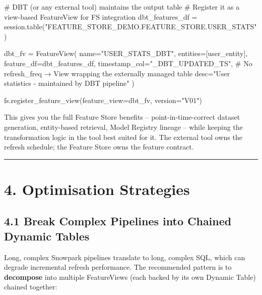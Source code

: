 \documentclass[
  letterpaper,
  DIV=11,
  numbers=noendperiod]{scrreprt}
\newenvironment{Shaded}{\begin{snugshade}}{\end{snugshade}}
\newcommand{\CommentTok}[1]{\textcolor[rgb]{0.37,0.37,0.37}{#1}}
\newcommand{\NormalTok}[1]{\textcolor[rgb]{0.00,0.23,0.31}{#1}}
\newcommand{\OperatorTok}[1]{\textcolor[rgb]{0.37,0.37,0.37}{#1}}
\newcommand{\StringTok}[1]{\textcolor[rgb]{0.13,0.47,0.30}{#1}}
\begin{document}
\begin{Shaded}
\begin{Highlighting}[]
\CommentTok{\# DBT (or any external tool) maintains the output table}
\CommentTok{\# Register it as a view{-}based FeatureView for FS integration}
\NormalTok{dbt\_features\_df }\OperatorTok{=}\NormalTok{ session.table(}\StringTok{"FEATURE\_STORE\_DEMO.FEATURE\_STORE.USER\_STATS"}\NormalTok{)}

\NormalTok{dbt\_fv }\OperatorTok{=}\NormalTok{ FeatureView(}
\NormalTok{    name}\OperatorTok{=}\StringTok{"USER\_STATS\_DBT"}\NormalTok{,}
\NormalTok{    entities}\OperatorTok{=}\NormalTok{[user\_entity],}
\NormalTok{    feature\_df}\OperatorTok{=}\NormalTok{dbt\_features\_df,}
\NormalTok{    timestamp\_col}\OperatorTok{=}\StringTok{"\_DBT\_UPDATED\_TS"}\NormalTok{,}
    \CommentTok{\# No refresh\_freq → View wrapping the externally managed table}
\NormalTok{    desc}\OperatorTok{=}\StringTok{"User statistics {-} maintained by DBT pipeline"}
\NormalTok{)}

\NormalTok{fs.register\_feature\_view(feature\_view}\OperatorTok{=}\NormalTok{dbt\_fv, version}\OperatorTok{=}\StringTok{"V01"}\NormalTok{)}
\end{Highlighting}
\end{Shaded}

This gives you the full Feature Store benefits -- point-in-time-correct
dataset generation, entity-based retrieval, Model Registry lineage --
while keeping the transformation logic in the tool best suited for it.
The external tool owns the refresh schedule; the Feature Store owns the
feature contract.

\begin{center}\rule{0.5\linewidth}{0.5pt}\end{center}

\hypertarget{optimisation-strategies}{%
\section{4. Optimisation Strategies}\label{optimisation-strategies}}

\hypertarget{break-complex-pipelines-into-chained-dynamic-tables}{%
\subsection{4.1 Break Complex Pipelines into Chained Dynamic
Tables}\label{break-complex-pipelines-into-chained-dynamic-tables}}

Long, complex Snowpark pipelines translate to long, complex SQL, which
can degrade incremental refresh performance. The recommended pattern is
to \textbf{decompose} into multiple FeatureViews (each backed by its own
Dynamic Table) chained together:
\end{document}
